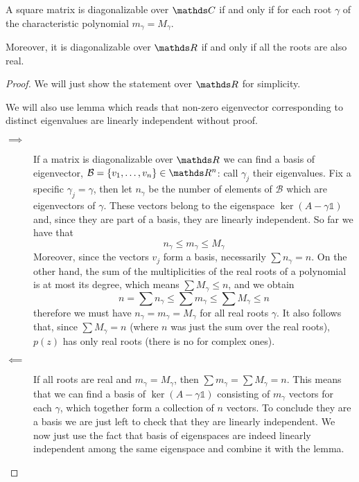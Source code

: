 \documentclass[12pt]{extarticle}
\numberwithin{equation}{section}
\begin{document}
\begin{theorem}{}{}
	A square matrix is diagonalizable over $\C$ if and only if
	for each root $\gamma$ of the characteristic polynomial
	$m_\gamma = M_\gamma$.

	Moreover, it is diagonalizable over $\R$ if and only if all the roots are also real.
\end{theorem}

\begin{proof}
	We will just show the statement over $\R$ for simplicity.

	We will also use lemma which reads that non-zero eigenvector corresponding
	to distinct eigenvalues are linearly independent without proof.

	\begin{description}
		\item[$\implies$] If a matrix is diagonalizable over $\R$ we can find a basis of eigenvector,
		      $\mathcal B = \{v_1, \dots, v_n \} \in \R^n$: call $\gamma_j$ their eigenvalues.
		      Fix a specific $\gamma_j = \gamma$, then let $n_\gamma$ be the number of elements of $\mathcal B$
		      which are eigenvectors of $\gamma$.
		      These vectors belong to the eigenspace $\ker (A - \gamma \mathds 1)$ and,
		      since they are part of a basis, they are linearly independent.
		      So far we have that
		      \begin{equation}
			      n_\gamma \leq m_\gamma \leq M_\gamma
		      \end{equation}
		      Moreover, since the vectors $v_j$ form a basis, necessarily $\sum n_\gamma = n$.
		      On the other hand, the sum of the multiplicities of the real roots of a polynomial is at most its degree,
		      which means $\sum M_\gamma \leq n$, and we obtain
		      \begin{equation}
			      n = \sum n_\gamma \leq \sum m_\gamma \leq \sum M_\gamma \leq n
		      \end{equation}
		      therefore we must have $n_\gamma = m_\gamma = M_\gamma$ for all real roots $\gamma$.
		      It also follows that, since $\sum M_\gamma = n$ (where $n$ was just the sum over the real roots),
		      $p(z)$ has only real roots (there is no  for complex ones).
		\item[$\impliedby$] If all roots are real and $m_\gamma = M_\gamma$, then $\sum m_\gamma = \sum M_\gamma = n$.
		      This means that we can find a basis of $\ker(A - \gamma \mathds{1})$ consisting of $m_\gamma$ vectors
		      for each $\gamma$, which together form a collection of $n$ vectors.
		      To conclude they are a basis we are just left to check that they are linearly independent.
		      We now just use the fact that basis of eigenspaces are indeed linearly independent among the same eigenspace
		      and combine it with the lemma.
	\end{description}
\end{proof}
\end{document}

